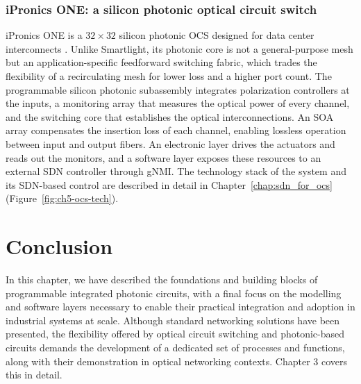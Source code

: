 \subsubsection{iPronics ONE: a silicon photonic optical circuit switch}\label{sub:one}
iPronics ONE is a $32\times32$ silicon photonic OCS designed for data center interconnects \cite{ipronics_one32_2025}.
Unlike Smartlight, its photonic core is not a general-purpose mesh but an application-specific feedforward switching fabric, which trades the flexibility of a recirculating mesh for lower loss and a higher port count.
The programmable silicon photonic subassembly integrates polarization controllers at the inputs, a monitoring array that measures the optical power of every channel, and the switching core that establishes the optical interconnections.
An SOA array compensates the insertion loss of each channel, enabling lossless operation between input and output fibers.
An electronic layer drives the actuators and reads out the monitors, and a software layer exposes these resources to an external SDN controller through gNMI.
The technology stack of the system and its SDN-based control are described in detail in Chapter~\ref{chap:sdn_for_ocs} (Figure~\ref{fig:ch5-ocs-tech}).

\section{Conclusion}\label{sub:ch2_conclusion}
In this chapter, we have described the foundations and building blocks of programmable integrated photonic circuits, with a final focus on the modelling and software layers necessary to enable their practical integration and adoption in industrial systems at scale.
Although standard networking solutions have been presented, the flexibility offered by optical circuit switching and photonic-based circuits demands the development of a dedicated set of processes and functions, along with their demonstration in optical networking contexts.
Chapter 3 covers this in detail.